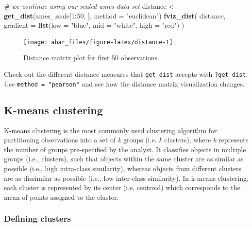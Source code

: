 \documentclass[]{book}
\newenvironment{Shaded}{\begin{snugshade}}{\end{snugshade}}
\newcommand{\CommentTok}[1]{\textcolor[rgb]{0.56,0.35,0.01}{\textit{#1}}}
\newcommand{\DataTypeTok}[1]{\textcolor[rgb]{0.13,0.29,0.53}{#1}}
\newcommand{\DecValTok}[1]{\textcolor[rgb]{0.00,0.00,0.81}{#1}}
\newcommand{\KeywordTok}[1]{\textcolor[rgb]{0.13,0.29,0.53}{\textbf{#1}}}
\newcommand{\NormalTok}[1]{#1}
\newcommand{\OperatorTok}[1]{\textcolor[rgb]{0.81,0.36,0.00}{\textbf{#1}}}
\newcommand{\StringTok}[1]{\textcolor[rgb]{0.31,0.60,0.02}{#1}}
\theoremstyle{definition}
\theoremstyle{definition}
\theoremstyle{definition}
\theoremstyle{remark}
\let\BeginKnitrBlock\begin \let\EndKnitrBlock\end
\begin{document}
\begin{Shaded}
\begin{Highlighting}[]
\CommentTok{# we continue using our scaled ames data set}
\NormalTok{distance <-}\StringTok{ }\KeywordTok{get_dist}\NormalTok{(ames_scale[}\DecValTok{1}\OperatorTok{:}\DecValTok{50}\NormalTok{, ], }\DataTypeTok{method =} \StringTok{"euclidean"}\NormalTok{)}
\KeywordTok{fviz_dist}\NormalTok{(}
\NormalTok{  distance,}
  \DataTypeTok{gradient =} \KeywordTok{list}\NormalTok{(}\DataTypeTok{low =} \StringTok{"blue"}\NormalTok{, }\DataTypeTok{mid =} \StringTok{"white"}\NormalTok{, }\DataTypeTok{high =} \StringTok{"red"}\NormalTok{)}
\NormalTok{  )}
\end{Highlighting}
\end{Shaded}

\begin{figure}

{\centering \texttt{[image: abar\_files/figure-latex/distance-1]} 

}

\caption{Distance matrix plot for first 50 observations.}\label{fig:distance}
\end{figure}

\BeginKnitrBlock{tip}
Check out the different distance measures that \texttt{get\_dist}
accepts with \texttt{?get\_dist}. Use \texttt{method\ =\ "pearson"} and
see how the distance matrix visualization changes.
\EndKnitrBlock{tip}

\hypertarget{k-means-clustering}{%
\subsection{K-means clustering}\label{k-means-clustering}}

K-means clustering is the most commonly used clustering algorithm for
partitioning observations into a set of \emph{k} groups (i.e. \emph{k}
clusters), where \emph{k} represents the number of groups pre-specified
by the analyst. It classifies objects in multiple groups (i.e.,
clusters), such that objects within the same cluster are as similar as
possible (i.e., high intra-class similarity), whereas objects from
different clusters are as dissimilar as possible (i.e., low inter-class
similarity). In k-means clustering, each cluster is represented by its
center (i.e, centroid) which corresponds to the mean of points assigned
to the cluster.

\hypertarget{defining-clusters}{%
\subsubsection{Defining clusters}\label{defining-clusters}}
\end{document}
